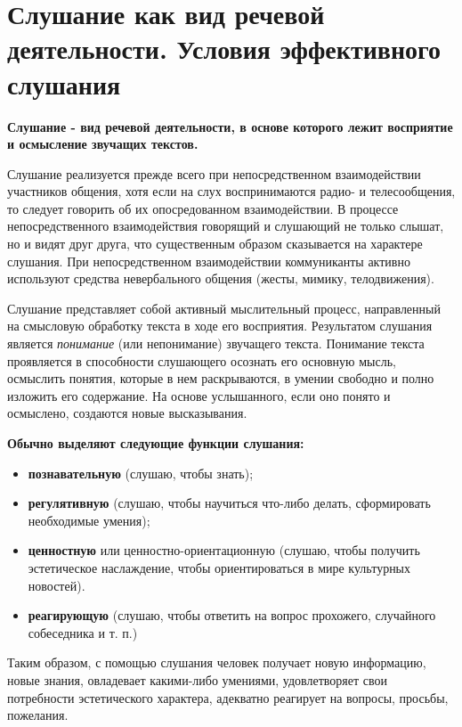 \section{Слушание как вид речевой деятельности. Условия эффективного слушания}

\textbf{Слушание - вид речевой деятельности, в основе которого лежит восприятие и осмысление звучащих текстов.}

Слушание реализуется прежде всего при непосредственном взаимодействии участников общения, хотя если на слух воспринимаются радио- и телесообщения, то следует говорить об их опосредованном взаимодействии. 
В процессе непосредственного взаимодействия говорящий и слушающий не только слышат, но и видят друг друга, что существенным образом сказывается на характере слушания. 
При непосредственном взаимодействии коммуниканты активно используют средства невербального общения (жесты, мимику, телодвижения).

Слушание представляет собой активный мыслительный процесс, направленный на смысловую обработку текста в ходе его восприятия. 
Результатом слушания является \textit{понимание} (или непонимание) звучащего текста. 
Понимание текста проявляется в способности слушающего осознать его основную мысль, осмыслить понятия, которые в нем раскрываются, в умении свободно и полно изложить его содержание. На основе услышанного, если оно понято и осмыслено, создаются новые высказывания.

\textbf{Обычно выделяют следующие функции слушания: }
\begin{itemize}
	\item \textbf{познавательную} (слушаю, чтобы знать);
	\item \textbf{регулятивную }(слушаю, чтобы научиться что-либо делать, сформировать необходимые умения); 
	\item \textbf{ценностную} или ценностно-ориентационную (слушаю, чтобы получить эстетическое наслаждение, чтобы ориентироваться в мире культурных новостей).
	\item \textbf{реагирующую} (слушаю, чтобы ответить на вопрос прохожего, случайного собеседника и т. п.)
\end{itemize}

Таким образом, с помощью слушания человек получает новую информацию, новые знания, овладевает какими-либо умениями, удовлетворяет свои потребности эстетического характера, адекватно реагирует на вопросы, просьбы, пожелания.

